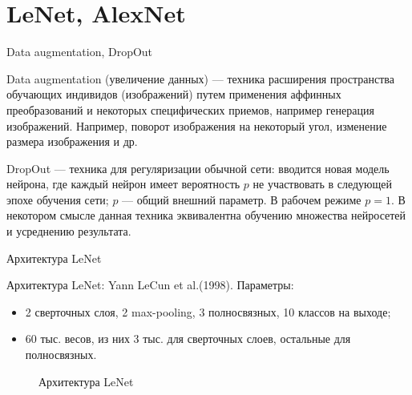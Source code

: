 \documentclass[11pt, intlimits]{beamer}
\begin{document}
\section{LeNet, AlexNet}

\begin{frame}{Data augmentation, DropOut}

\begin{definition}{Data augmentation}
(увеличение данных) --- техника расширения пространства обучающих индивидов (изображений) путем применения аффинных преобразований и некоторых специфических приемов, например генерация изображений. Например, поворот изображения на некоторый угол, изменение размера изображения и др.
\end{definition}

\begin{definition}{DropOut}
--- техника для регуляризации обычной сети: вводится новая модель нейрона, где каждый нейрон имеет вероятность $p$ не участвовать в следующей эпохе обучения сети; $p$ --- общий внешний параметр. В рабочем режиме $p=1$. В некотором смысле данная техника эквивалентна обучению множества нейросетей и усреднению результата. 
\end{definition}


\end{frame}

\begin{frame}{Архитектура LeNet}

Архитектура LeNet: Yann LeCun et al.(1998). Параметры:
\begin{itemize}
\item 2 сверточных слоя, 2 max-pooling, 3 полносвязных, 10 классов на выходе;
\item 60 тыс. весов, из них 3 тыс. для сверточных слоев, остальные для полносвязных.
\end{itemize}

\begin{figure}[h]
\caption{Архитектура LeNet}
\label{img:lenet}
\end{figure}

\end{frame}
\end{document}
